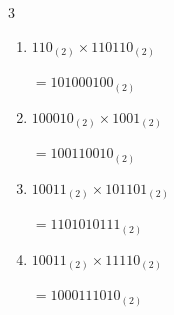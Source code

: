 \begin{multicols}{3}
\begin{enumerate}
        $=1000110_{(2)}$

  \item $110_{(2)} \times 110110_{(2)}$

        $=101000100_{(2)}$

  \item $100010_{(2)} \times 1001_{(2)}$

        $=100110010_{(2)}$

  \item $10011_{(2)} \times 101101_{(2)}$

        $=1101010111_{(2)}$

  \item $10011_{(2)} \times 11110_{(2)}$

        $=1000111010_{(2)}$

\end{enumerate}
\end{multicols}
